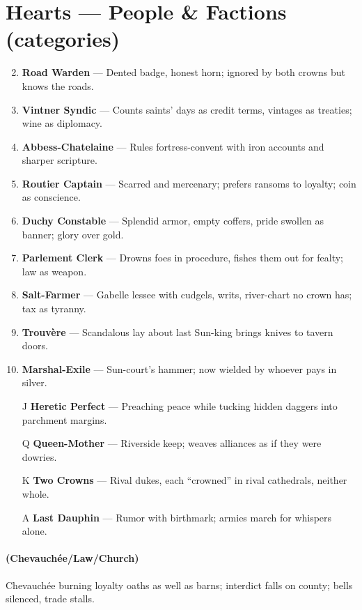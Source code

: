 \section*{Hearts --- People \& Factions (categories)}
\label{sec:vhasia-people}
\begin{enumerate}
\setcounter{enumi}{1}
\item \textbf{Road Warden} --- Dented badge, honest horn; ignored by both crowns but knows the roads.
\item \textbf{Vintner Syndic} --- Counts saints' days as credit terms, vintages as treaties; wine as diplomacy.
\item \textbf{Abbess-Chatelaine} --- Rules fortress-convent with iron accounts and sharper scripture.
\item \textbf{Routier Captain} --- Scarred and mercenary; prefers ransoms to loyalty; coin as conscience.
\item \textbf{Duchy Constable} --- Splendid armor, empty coffers, pride swollen as banner; glory over gold.
\item \textbf{Parlement Clerk} --- Drowns foes in procedure, fishes them out for fealty; law as weapon.
\item \textbf{Salt-Farmer} --- Gabelle lessee with cudgels, writs, river-chart no crown has; tax as tyranny.
\item \textbf{Trouvère} --- Scandalous lay about last Sun-king brings knives to tavern doors.
\item \textbf{Marshal-Exile} --- Sun-court's hammer; now wielded by whoever pays in silver.
\item[J] \textbf{Heretic Perfect} --- Preaching peace while tucking hidden daggers into parchment margins.
\item[Q] \textbf{Queen-Mother} --- Riverside keep; weaves alliances as if they were dowries.
\item[K] \textbf{Two Crowns} --- Rival dukes, each ``crowned'' in rival cathedrals, neither whole.
\item[A] \textbf{Last Dauphin} --- Rumor with birthmark; armies march for whispers alone.
\end{enumerate}

\paragraph*{(Chevauchée/Law/Church)} Chevauchée burning loyalty oaths as well as barns; interdict falls on county; bells silenced, trade stalls.

